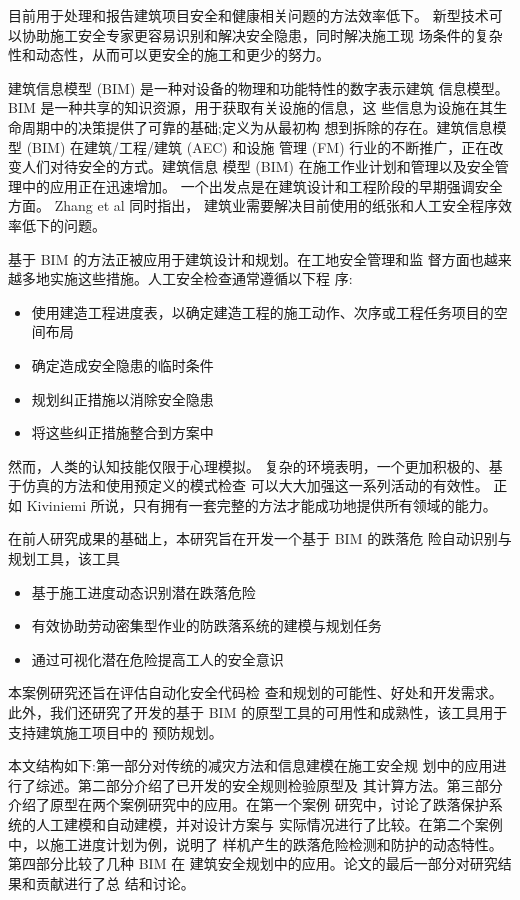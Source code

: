 目前用于处理和报告建筑项目安全和健康相关问题的方法效率低下。
新型技术可以协助施工安全专家更容易识别和解决安全隐患，同时解决施工现
场条件的复杂性和动态性，从而可以更安全的施工和更少的努力。

建筑信息模型 (BIM) 是一种对设备的物理和功能特性的数字表示建筑
信息模型。BIM 是一种共享的知识资源，用于获取有关设施的信息，这
些信息为设施在其生命周期中的决策提供了可靠的基础;定义为从最初构
想到拆除的存在。建筑信息模型 (BIM) 在建筑/工程/建筑 (AEC) 和设施
管理 (FM) 行业的不断推广，正在改变人们对待安全的方式。建筑信息
模型 (BIM) 在施工作业计划和管理以及安全管理中的应用正在迅速增加。
一个出发点是在建筑设计和工程阶段的早期强调安全方面。 Zhang et al 同时指出，
建筑业需要解决目前使用的纸张和人工安全程序效率低下的问题。

基于 BIM 的方法正被应用于建筑设计和规划。在工地安全管理和监
督方面也越来越多地实施这些措施。人工安全检查通常遵循以下程
序:
\begin{itemize}
    \item 使用建造工程进度表，以确定建造工程的施工动作、次序或工程任务项目的空间布局
    \item 确定造成安全隐患的临时条件
    \item 规划纠正措施以消除安全隐患
    \item 将这些纠正措施整合到方案中
\end{itemize}

然而，人类的认知技能仅限于心理模拟。
复杂的环境表明，一个更加积极的、基于仿真的方法和使用预定义的模式检查
可以大大加强这一系列活动的有效性。
正如 Kiviniemi 所说，只有拥有一套完整的方法才能成功地提供所有领域的能力。

在前人研究成果的基础上，本研究旨在开发一个基于 BIM 的跌落危
险自动识别与规划工具，该工具

\begin{itemize}
    \item 基于施工进度动态识别潜在跌落危险
    \item 有效协助劳动密集型作业的防跌落系统的建模与规划任务
    \item 通过可视化潜在危险提高工人的安全意识
\end{itemize}

本案例研究还旨在评估自动化安全代码检
查和规划的可能性、好处和开发需求。此外，我们还研究了开发的基于
BIM 的原型工具的可用性和成熟性，该工具用于支持建筑施工项目中的
预防规划。

本文结构如下:第一部分对传统的减灾方法和信息建模在施工安全规
划中的应用进行了综述。第二部分介绍了已开发的安全规则检验原型及
其计算方法。第三部分介绍了原型在两个案例研究中的应用。在第一个案例
研究中，讨论了跌落保护系统的人工建模和自动建模，并对设计方案与
实际情况进行了比较。在第二个案例中，以施工进度计划为例，说明了
样机产生的跌落危险检测和防护的动态特性。第四部分比较了几种 BIM 在
建筑安全规划中的应用。论文的最后一部分对研究结果和贡献进行了总
结和讨论。